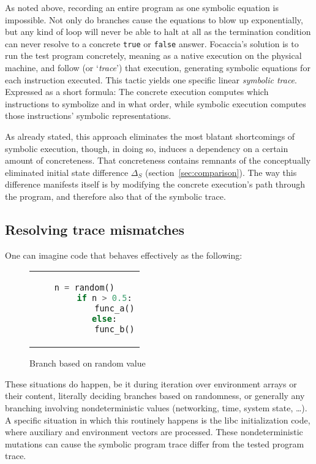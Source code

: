 As noted above, recording an entire program as one symbolic equation is impossible. Not only do branches cause the
equations to blow up exponentially, but any kind of loop will never be able to halt at all as the termination condition
can never resolve to a concrete \texttt{true} or \texttt{false} answer. Focaccia's solution is to run the test program
concretely, meaning as a native execution on the physical machine, and follow (or `\textit{trace}') that execution,
generating symbolic equations for each instruction executed. This tactic yields one specific linear \textit{symbolic
trace}. Expressed as a short formula: The concrete execution computes which instructions to symbolize and in what order,
while symbolic execution computes those instructions' symbolic representations.

As already stated, this approach eliminates the most blatant shortcomings of symbolic execution, though, in doing so,
induces a dependency on a certain amount of concreteness. That concreteness contains remnants of the conceptually
eliminated initial state difference $\Delta_S$ (section~\ref{sec:comparison}). The way this difference manifests
itself is by modifying the concrete execution's path through the program, and therefore also that of the symbolic trace.

\subsection{Resolving trace mismatches}\label{sec:trace_mismatch}

One can imagine code that behaves effectively as the following:

\begin{figure}[htbp]
    \centering
    \begin{tabular}{c}
    \begin{lstlisting}[language=Python]
        n = random()
        if n > 0.5:
            func_a()
        else:
            func_b()
    \end{lstlisting}
    \end{tabular}
    \caption[Random Branching]{Branch based on random value}\label{fig:random_branching}
\end{figure}

These situations do happen, be it during iteration over environment arrays or their content, literally deciding branches
based on randomness, or generally any branching involving nondeterministic values (networking, time, system state, …). A
specific situation in which this routinely happens is the libc initialization code, where auxiliary and environment
vectors are processed. These nondeterministic mutations can cause the symbolic program trace differ from the tested
program trace.

